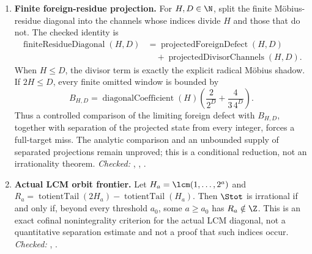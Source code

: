 {\begin{enumerate}[label=\textbf{R\arabic*.},ref=R\arabic*,leftmargin=2.4em,
  itemsep=0.2em,topsep=0.25em]
\item\label{res:foreignresidue} 
\textbf{Finite foreign-residue projection.}  For $H,D\in\N$, split the
finite Möbius-residue diagonal into the channels whose indices divide $H$ and
those that do not.  The checked identity is
\[
 \begin{aligned}
 \operatorname{finiteResidueDiagonal}(H,D)
   &=\operatorname{projectedForeignDefect}(H,D)\\
   &\quad+\operatorname{projectedDivisorChannels}(H,D).
 \end{aligned}
\]
When $H\le D$, the divisor term is exactly the explicit radical Möbius
shadow.  If $2H\le D$, every finite omitted window is bounded by
\[
 B_{H,D}=\operatorname{diagonalCoefficient}(H)\left(
       \frac{2}{2^D}+\frac{4}{3\,4^D}\right).
\]
Thus a controlled comparison of the limiting foreign defect with $B_{H,D}$,
together with separation of the projected state from every integer, forces a
full-target miss.  The analytic comparison and an unbounded supply of
separated projections remain unproved; this is a conditional reduction, not
an irrationality theorem.
{\footnotesize\emph{Checked:}
,
,
.}

\item\label{res:actualorbit} 
\textbf{Actual LCM orbit frontier.}  Let
$H_a=\lcm(1,\ldots,2^a)$ and
$R_a=\operatorname{totientTail}(2H_a)-\operatorname{totientTail}(H_a)$.
Then $\Stot$ is irrational if and only if, beyond every threshold $a_0$,
some $a\ge a_0$ has $R_a\notin\Z$.  This is an exact cofinal
nonintegrality criterion for the actual LCM diagonal, not a quantitative
separation estimate and not a proof that such indices occur.
{\footnotesize\emph{Checked:}
,
.}


\end{enumerate}}
